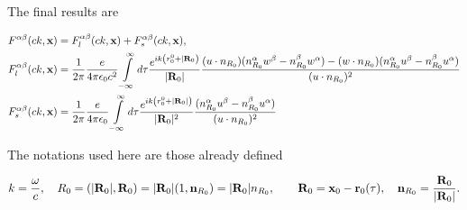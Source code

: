 The final results are
\begin{highlightbox}[title={Exact Fourier-transformed Faraday tensor}]
  \begin{align}
    F^{\alpha\beta}(c k,{\bf x})  & = F^{\alpha\beta}_{l}(c k,{\bf x}) + F^{\alpha\beta}_{s}(c k,{\bf x}),
    \\
    F_l^{\alpha\beta}(ck,{\bf x}) & =\frac1{2\pi}\frac{e}{4\pi\epsilon_0c^2}\int\limits_{-\infty}^{\infty}d\tau \frac{e^{ik\left(r_0^0+|{\bf R}_0\right)}}{|{\bf R}_0|}\frac{(u\cdot n_{R_0})(n_{R_0}^{\alpha}w^{\beta}-n_{R_0}^{\beta}w^{\alpha})-(w\cdot n_{R_0})(n_{R_0}^{\alpha}u^{\beta}-n_{R_0}^{\beta}u^{\alpha})}
    {(u\cdot n_{R_0})^2}                                                                                                                                                                                                                                             \\
    F_s^{\alpha\beta}(ck,{\bf x}) & =\frac1{2\pi}\frac{e}{4\pi\epsilon_0}\int\limits_{-\infty}^{\infty}d\tau \frac{e^{ik\left(r_0^0+|{\bf R}_0|\right)}}{|{\bf R}_0|^2}\frac{(n_{R_0}^{\alpha}u^{\beta}-n_{R_0}^{\beta}u^{\alpha})}
    {(u\cdot n_{R_0})^2}
  \end{align}
\end{highlightbox}
The notations used here are those already defined
\begin{highlightbox}
  \begin{align}
    k = \frac{\omega}{c},\quad
    R_0 = (|{\bf R}_0|,{\bf R}_0)=|{\bf R}_0| (1,{\bf n}_{R_0}) = |{\bf R}_0|n_{R_0}, \qquad {\bf R}_0 = {\bf x}_0-{\bf r}_0(\tau),\quad {\bf n}_{R_0} = \frac{{\bf R}_0}{|{\bf R}_0|}.
  \end{align}
\end{highlightbox}
